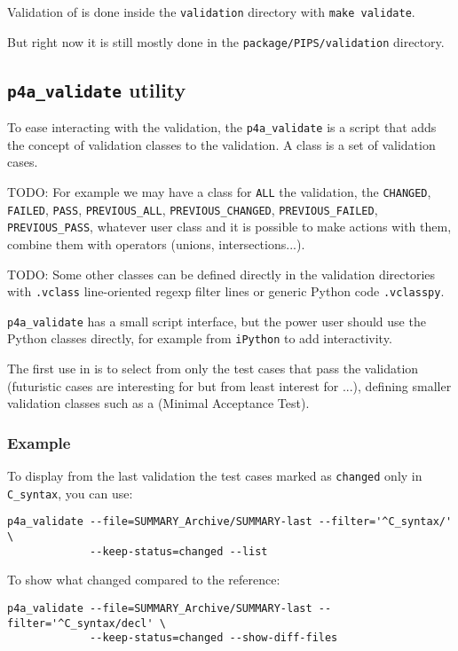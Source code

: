 \documentclass[a4paper]{article}
\begin{document}
Validation of \Apfa is done inside the \texttt{validation} directory with
\texttt{make validate}.

But right now it is still mostly done in the
\texttt{package/PIPS/validation} directory.


\subsection{\protect\texttt{p4a\_validate} utility}
\label{sec:p4a_validate-utility}


To ease interacting with the validation, the \verb|p4a_validate| is a
script that adds the concept of validation classes to the \Apips
validation. A class is a set of validation cases.

TODO: For example we may have a class for \texttt{ALL} the validation, the
\texttt{CHANGED}, \texttt{FAILED}, \texttt{PASS}, \verb|PREVIOUS_ALL|,
\verb|PREVIOUS_CHANGED|, \verb|PREVIOUS_FAILED|, \verb|PREVIOUS_PASS|,
whatever user class and it is possible to make actions with them, combine
them with operators (unions, intersections...).

TODO: Some other classes can be defined directly in the validation
directories with \texttt{.vclass} line-oriented regexp filter lines or
generic Python code \texttt{.vclasspy}.

\verb|p4a_validate| has a small script interface, but the power user
should use the Python classes directly, for example from \texttt{iPython}
to add interactivity.

The first use in \Apfa is to select from \Apips only the test cases that
pass the validation (futuristic cases are interesting for \Apips but from
least interest for \Apfa...), defining smaller validation classes such as
a \Amat (Minimal Acceptance Test).


\subsubsection{Example}
\label{sec:example}

To display from the last validation the test cases marked as
\texttt{changed} only in \verb|C_syntax|, you can use:
\begin{verbatim}
p4a_validate --file=SUMMARY_Archive/SUMMARY-last --filter='^C_syntax/' \
             --keep-status=changed --list
\end{verbatim}

To show what changed compared to the reference:
\begin{verbatim}
p4a_validate --file=SUMMARY_Archive/SUMMARY-last --filter='^C_syntax/decl' \
             --keep-status=changed --show-diff-files
\end{verbatim}
\end{document}
